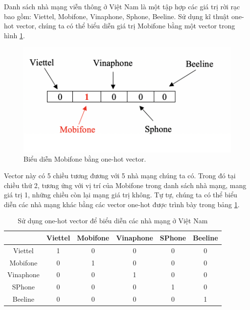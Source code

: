 Danh sách nhà mạng viễn thông ở Việt Nam là một tập hợp các giá trị rời rạc bao gồm: Viettel, Mobifone, Vinaphone, Sphone, Beeline. Sử dụng kĩ thuật one-hot vector, chúng ta có thể biểu diễn giá trị Mobifone bằng một vector trong hình \ref{fig:mobifone-onthot}.

\begin{figure}[h!]
\begin{center}
	\includegraphics[width=1.0\textwidth]{books/artificial-neural-network/chapter04/figure/mobifone-onehot.png}
	\caption{Biểu diễn Mobifone bằng one-hot vector.}
	\label{fig:mobifone-onthot}
\end{center}
\end{figure}

Vector này có 5 chiều tương đương với 5 nhà mạng chúng ta có. Trong đó tại chiều thứ 2, tương ứng với vị trí của Mobifone trong danh sách nhà mạng, mang giá trị 1, những chiều còn lại mạng giá trị không. Tự tự, chúng ta có thể biểu diễn các nhà mạng khác bằng các vector one-hot được trình bày trong bảng \ref{table:one-hot-vector-example}.

\begin{table}[h!]
    \centering
    \begin{tabular}{ |c|c|c|c|c|c| }
    \hline
         & Viettel & Mobifone & Vinaphone & SPhone & Beeline \\
    \hline
        Viettel & 1 & 0 & 0 & 0 & 0 \\
        Mobifone & 0 & 1 & 0 & 0 & 0\\
        Vinaphone & 0 & 0 & 1 & 0 & 0\\
        SPhone & 0 & 0 & 0 & 1 & 0\\
        Beeline & 0 & 0 & 0 & 0 & 1 \\
    \hline
    \end{tabular}
    \caption{Sử dụng one-hot vector để biểu diễn các nhà mạng ở Việt Nam}
    \label{table:one-hot-vector-example}
\end{table}

